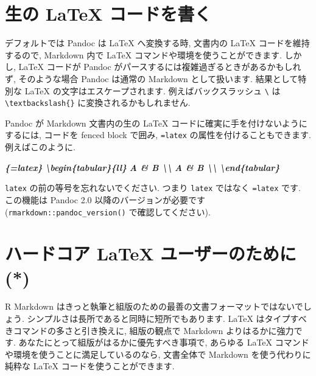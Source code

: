 \documentclass[
  11pt,
]{bxjsreport}
\newenvironment{Shaded}{\begin{snugshade}}{\end{snugshade}}
\newcommand{\InformationTok}[1]{\textcolor[rgb]{0.56,0.35,0.01}{\textbf{\textit{#1}}}}
\begin{document}
\hypertarget{raw-latex}{%
\section{生の LaTeX コードを書く}\label{raw-latex}}

デフォルトでは Pandoc は LaTeX へ変換する時, 文書内の LaTeX コードを維持するので, Markdown 内で LaTeX コマンドや環境を使うことができます. しかし, LaTeX コードが Pandoc がパースするには複雑過ぎるときがあるかもしれず, そのような場合 Pandoc は通常の Markdown として扱います. 結果として特別な LaTeX の文字はエスケープされます. 例えばバックスラッシュ \texttt{\textbackslash{}} は \texttt{\textbackslash{}textbackslash\{\}} に変換されるかもしれません.

Pandoc が Markdown 文書内の生の LaTeX コードに確実に手を付けないようにするには, コードを fenced block で囲み, \texttt{=latex} の属性を付けることもできます. 例えばこのように.

\begin{Shaded}
\begin{Highlighting}[]
\InformationTok{\textasciigrave{}\textasciigrave{}\textasciigrave{}\{=latex\}}
\InformationTok{\textbackslash{}begin\{tabular\}\{ll\}}
\InformationTok{A \& B \textbackslash{}\textbackslash{}}
\InformationTok{A \& B \textbackslash{}\textbackslash{}}
\InformationTok{\textbackslash{}end\{tabular\}}
\InformationTok{\textasciigrave{}\textasciigrave{}\textasciigrave{}}
\end{Highlighting}
\end{Shaded}

\texttt{latex} の前の等号を忘れないでください. つまり \texttt{latex} ではなく \texttt{=latex} です. この機能は Pandoc 2.0 以降のバージョンが必要です (\texttt{rmarkdown::pandoc\_version()} で確認してください).

\hypertarget{latex-hardcore}{%
\section{ハードコア LaTeX ユーザーのために (*)}\label{latex-hardcore}}

R Markdown はきっと執筆と組版のための最善の文書フォーマットではないでしょう. シンプルさは長所であると同時に短所でもあります. LaTeX はタイプすべきコマンドの多さと引き換えに, 組版の観点で Markdown よりはるかに強力です. あなたにとって組版がはるかに優先すべき事項で, あらゆる LaTeX コマンドや環境を使うことに満足しているのなら, 文書全体で Markdown を使う代わりに純粋な LaTeX コードを使うことができます.
\end{document}
